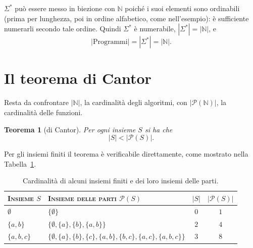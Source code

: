 \documentclass[a4paper, 11pt, oneside]{book}
\theoremstyle{formale}
\newtheorem{theorem}{Teorema}
\begin{document}
    $\Sigma^*$ pu\`o essere messo in biezione con $\mathbb{N}$ poich\'e i suoi elementi sono
    ordinabili (prima per lunghezza, poi in ordine alfabetico, come nell'esempio): \`e
    sufficiente numerarli secondo tale ordine. Quindi $\Sigma^*$ \`e numerabile,
    $|\Sigma^*| = |\mathbb{N}|$, e
    \begin{equation*}
        |\text{Programmi}| = |\Sigma^*| = |\mathbb{N}|.
    \end{equation*}

    \section{Il teorema di Cantor}
    \label{sec:cantor}
    Resta da confrontare $|\mathbb{N}|$, la cardinalit\`a degli algoritmi, con
    $|\mathcal{P}(\mathbb{N})|$, la cardinalit\`a delle funzioni.

    \begin{theorem}[di Cantor]
        \label{thm:cantor}
        Per ogni insieme $S$ si ha che
        \begin{equation*}
            |S| < |\mathcal{P}(S)|.
        \end{equation*}
    \end{theorem}

    Per gli insiemi finiti il teorema \`e verificabile direttamente, come mostrato nella
    Tabella~\ref{tab:parti}.

    \begin{table}[H]
        \centering
        \begin{tabular}{llcc}
            \toprule
            \textsc{Insieme} $S$ & \textsc{Insieme delle parti} $\mathcal{P}(S)$ & $|S|$
                & $|\mathcal{P}(S)|$ \\
            \midrule
            $\emptyset$ & $\{\emptyset\}$ & $0$ & $1$ \\
            $\{a, b\}$ & $\{\emptyset, \{a\}, \{b\}, \{a, b\}\}$ & $2$ & $4$ \\
            $\{a, b, c\}$ & $\{\emptyset, \{a\}, \{b\}, \{c\}, \{a, b\}, \{b, c\}, \{a, c\},
                \{a, b, c\}\}$ & $3$ & $8$ \\
            \bottomrule
        \end{tabular}
        \caption{Cardinalit\`a di alcuni insiemi finiti e dei loro insiemi delle parti.}
        \label{tab:parti}
    \end{table}
\end{document}
